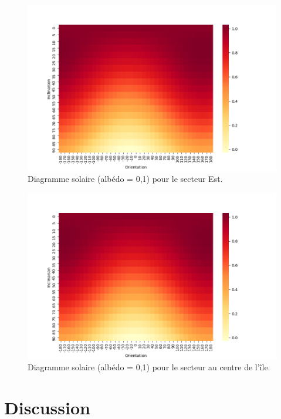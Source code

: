 \documentclass[12pt,a4paper,openright]{report}
\begin{document}
\begin{figure}[h]
\begin{center}
\includegraphics[scale=0.6]{secteurEst}
\caption{Diagramme solaire (albédo = 0,1) pour le secteur Est.}
\end{center}
\end{figure}
\newpage
\begin{figure}[h!]
\begin{center}
\includegraphics[scale=0.6]{secteurCentre}
\caption{Diagramme solaire (albédo = 0,1) pour le secteur au centre de l'île.}
\end{center}
\end{figure}

\newpage
\section{Discussion}
\end{document}
